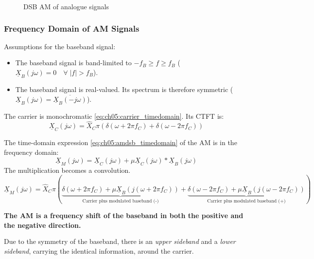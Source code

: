 \begin{refsection}
\begin{figure}[H]
	\caption{\acs{DSB} \acs{AM} of analogue signals}
\end{figure}

\subsubsection{Frequency Domain of AM Signals}

Assumptions for the baseband signal:
\begin{itemize}
	\item The baseband signal is band-limited to $-f_B \geq f \geq f_B$ ($\underline{X}_B\left(j\omega\right) = 0 \quad \forall \; |f| > f_B$).
	\item The baseband signal is real-valued. Its spectrum is therefore symmetric ($\underline{X}_B\left(j\omega\right) = \overline{\underline{X}_B\left(-j\omega\right)}$).
\end{itemize}

The carrier is monochromatic \eqref{eq:ch05:carrier_timedomain}. Its \ac{CTFT} is:
\begin{equation}
	\underline{X}_C\left(j\omega\right) = \hat{X}_C \pi \left( \delta\left(\omega + 2 \pi f_C \right) + \delta\left(\omega - 2 \pi f_C \right) \right)
\end{equation}

The time-domain expression \eqref{eq:ch05:amdsb_timedomain} of the \ac{AM} is in the frequency domain:
\begin{equation}
	\underline{X}_M\left(j\omega\right) = \underline{X}_C\left(j\omega\right) + \mu \underline{X}_C\left(j\omega\right) * \underline{X}_B\left(j\omega\right)
\end{equation}
The multiplication becomes a convolution.
\begin{equation}
	\underline{X}_M\left(j\omega\right) = \hat{X}_C \pi \left( \underbrace{\delta\left(\omega + 2 \pi f_C \right) + \mu \underline{X}_B\left(j\left(\omega + 2 \pi f_C\right)\right)}_{\text{Carrier plus modulated baseband (-)}} + \underbrace{\delta\left(\omega - 2 \pi f_C \right) + \mu \underline{X}_B\left(j\left(\omega - 2 \pi f_C\right)\right)}_{\text{Carrier plus modulated baseband (+)}} \right)
\end{equation}

\textbf{The \ac{AM} is a frequency shift of the baseband in both the positive and the negative direction.}

Due to the symmetry of the baseband, there is an \emph{upper sideband} and a \emph{lower sideband}, carrying the identical information, around the carrier.


\end{refsection}
